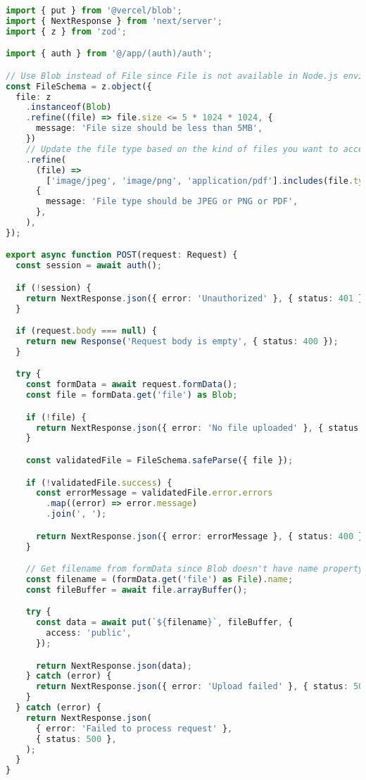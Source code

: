 \begin{lstlisting}[language=TypeScript, caption={Chat dengan AI}]
import { put } from '@vercel/blob';
import { NextResponse } from 'next/server';
import { z } from 'zod';

import { auth } from '@/app/(auth)/auth';

// Use Blob instead of File since File is not available in Node.js environment
const FileSchema = z.object({
  file: z
    .instanceof(Blob)
    .refine((file) => file.size <= 5 * 1024 * 1024, {
      message: 'File size should be less than 5MB',
    })
    // Update the file type based on the kind of files you want to accept
    .refine(
      (file) =>
        ['image/jpeg', 'image/png', 'application/pdf'].includes(file.type),
      {
        message: 'File type should be JPEG or PNG or PDF',
      },
    ),
});

export async function POST(request: Request) {
  const session = await auth();

  if (!session) {
    return NextResponse.json({ error: 'Unauthorized' }, { status: 401 });
  }

  if (request.body === null) {
    return new Response('Request body is empty', { status: 400 });
  }

  try {
    const formData = await request.formData();
    const file = formData.get('file') as Blob;

    if (!file) {
      return NextResponse.json({ error: 'No file uploaded' }, { status: 400 });
    }

    const validatedFile = FileSchema.safeParse({ file });

    if (!validatedFile.success) {
      const errorMessage = validatedFile.error.errors
        .map((error) => error.message)
        .join(', ');

      return NextResponse.json({ error: errorMessage }, { status: 400 });
    }

    // Get filename from formData since Blob doesn't have name property
    const filename = (formData.get('file') as File).name;
    const fileBuffer = await file.arrayBuffer();

    try {
      const data = await put(`${filename}`, fileBuffer, {
        access: 'public',
      });

      return NextResponse.json(data);
    } catch (error) {
      return NextResponse.json({ error: 'Upload failed' }, { status: 500 });
    }
  } catch (error) {
    return NextResponse.json(
      { error: 'Failed to process request' },
      { status: 500 },
    );
  }
}
\end{lstlisting}